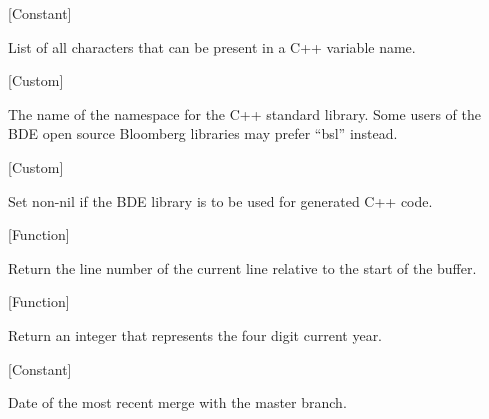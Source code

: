 \vspace{1em}
\noindent
{}
\usebox{\funcname}
 \hfill [Constant]

\begin{doc-string}
List of all characters that can be present in a C++ variable name.
\end{doc-string}

\vspace{1em}
\noindent
{}
\usebox{\funcname}
 \hfill [Custom]

\begin{doc-string}
The name of the namespace for the C++ standard library.  Some users of the
BDE open source Bloomberg libraries may prefer ``bsl'' instead.
\end{doc-string}

\vspace{1em}
\noindent
{}
\usebox{\funcname}
 \hfill [Custom]

\begin{doc-string}
Set non-nil if the BDE library is to be used for generated C++ code.
\end{doc-string}

\vspace{1em}
\noindent
{}
\usebox{\funcname}
 \hfill [Function]

\begin{doc-string}
Return the line number of the current line relative to the start of the buffer.
\end{doc-string}

\vspace{1em}
\noindent
{}
\usebox{\funcname}
 \hfill [Function]

\begin{doc-string}
Return an integer that represents the four digit current year.
\end{doc-string}

\vspace{1em}
\noindent
{}
\usebox{\funcname}
 \hfill [Constant]

\begin{doc-string}
Date of the most recent merge with the master branch.
\end{doc-string}

